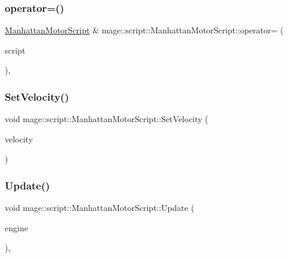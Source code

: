 \subsubsection{\texorpdfstring{operator=()}{operator=()}\hspace{0.1cm}{\footnotesize\ttfamily [2/2]}}
{\footnotesize\ttfamily \hyperlink{classmage_1_1script_1_1_manhattan_motor_script}{Manhattan\+Motor\+Script} \& mage\+::script\+::\+Manhattan\+Motor\+Script\+::operator= (\begin{DoxyParamCaption}\item[{\hyperlink{classmage_1_1script_1_1_manhattan_motor_script}{Manhattan\+Motor\+Script} \&\&}]{script }\end{DoxyParamCaption})\hspace{0.3cm}{\ttfamily [default]}, {\ttfamily [noexcept]}}

\hypertarget{classmage_1_1script_1_1_manhattan_motor_script_acf4db52ae6b0c9f97c0b7e719acea6bc}{}\label{classmage_1_1script_1_1_manhattan_motor_script_acf4db52ae6b0c9f97c0b7e719acea6bc} 
\subsubsection{\texorpdfstring{Set\+Velocity()}{SetVelocity()}}
{\footnotesize\ttfamily void mage\+::script\+::\+Manhattan\+Motor\+Script\+::\+Set\+Velocity (\begin{DoxyParamCaption}\item[{\hyperlink{namespacemage_aa97e833b45f06d60a0a9c4fc22ae02c0}{F32}}]{velocity }\end{DoxyParamCaption})\hspace{0.3cm}{\ttfamily [noexcept]}}

\hypertarget{classmage_1_1script_1_1_manhattan_motor_script_af1ee420e1378bf930cce1ce92a37d640}{}\label{classmage_1_1script_1_1_manhattan_motor_script_af1ee420e1378bf930cce1ce92a37d640} 
\subsubsection{\texorpdfstring{Update()}{Update()}}
{\footnotesize\ttfamily void mage\+::script\+::\+Manhattan\+Motor\+Script\+::\+Update (\begin{DoxyParamCaption}\item[{\mbox{[}\mbox{[}maybe\+\_\+unused\mbox{]} \mbox{]} \hyperlink{classmage_1_1_engine}{Engine} \&}]{engine }\end{DoxyParamCaption})\hspace{0.3cm}{\ttfamily [override]}, {\ttfamily [virtual]}}

